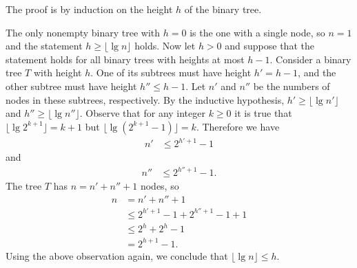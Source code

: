 The proof is by induction on the height $h$ of the binary tree.

The only nonempty binary tree with $h=0$ is the one with a single node, so $n=1$ and the statement $h\ge\lfloor\lg n\rfloor$ holds.
Now let $h>0$ and suppose that the statement holds for all binary trees with heights at most $h-1$.
Consider a binary tree $T$ with height $h$.
One of its subtrees must have height $h'=h-1$, and the other subtree must have height $h''\le h-1$.
Let $n'$ and $n''$ be the numbers of nodes in these subtrees, respectively.
By the inductive hypothesis, $h'\ge\lfloor\lg n'\rfloor$ and $h''\ge\lfloor\lg n''\rfloor$.
Observe that for any integer $k\ge0$ it is true that $\lfloor\lg2^{k+1}\rfloor=k+1$ but $\lfloor\lg(2^{k+1}-1)\rfloor=k$.
Therefore we have
\begin{align*}
    n' &\le 2^{h'+1}-1
\end{align*}
and
\begin{align*}
    n'' &\le 2^{h''+1}-1.
\end{align*}
The tree $T$ has $n=n'+n''+1$ nodes, so
\begin{align*}
    n &= n'+n''+1 \\
    &\le 2^{h'+1}-1+2^{h''+1}-1+1 \\
    &\le 2^h+2^h-1 \\
    &= 2^{h+1}-1.
\end{align*}
Using the above observation again, we conclude that $\lfloor\lg n\rfloor\le h$.
